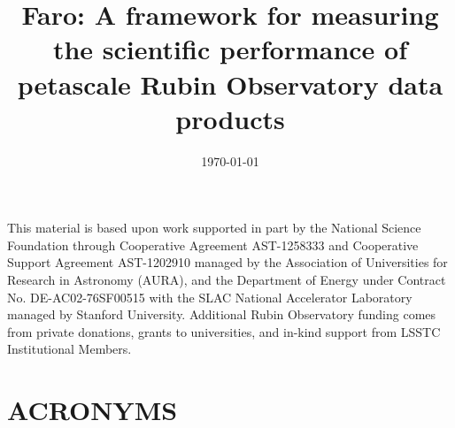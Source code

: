 \documentclass[]{spie}
\title{Faro: A framework for measuring the scientific performance of petascale Rubin Observatory data products}
\date{\today}
\def\acronyms{\section*{ACRONYMS}\label{sec:acronyms}}
\begin{document}
\maketitle



\listoftodos




\appendix
%

\acknowledgments

This material is based upon work supported in part by the National Science Foundation through Cooperative Agreement AST-1258333 and Cooperative Support Agreement AST-1202910 managed by the Association of Universities for Research in Astronomy (AURA), and the Department of Energy under Contract No. DE-AC02-76SF00515 with the SLAC National Accelerator Laboratory managed by Stanford University. 
Additional Rubin Observatory funding comes from private donations, grants to universities, and in-kind support from LSSTC Institutional Members.




\acronyms 

\end{document}
